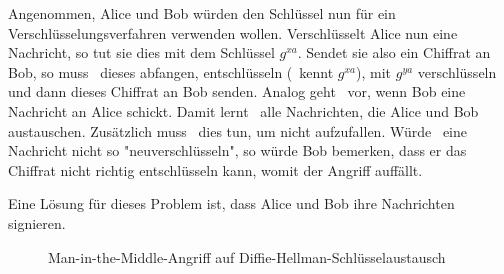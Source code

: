 Angenommen, Alice und Bob würden den Schlüssel nun für ein
Verschlüsselungsverfahren verwenden wollen. Verschlüsselt Alice nun eine
Nachricht, so tut sie dies mit dem Schlüssel $g^{xa}$. Sendet sie also ein
Chiffrat an Bob, so muss \A~dieses abfangen, entschlüsseln (\A~kennt
$g^{xa}$), mit $g^{ya}$ verschlüsseln und dann dieses Chiffrat an Bob
senden. Analog geht \A~vor, wenn Bob eine Nachricht an Alice
schickt. Damit lernt \A~alle Nachrichten, die Alice und Bob
austauschen. Zusätzlich muss \A~dies tun, um nicht aufzufallen. Würde
\A~eine Nachricht nicht so "neuverschlüsseln", so würde Bob bemerken,
dass er das Chiffrat nicht richtig entschlüsseln kann, womit der Angriff
auffällt.

Eine Lösung für dieses Problem ist, dass Alice und Bob ihre Nachrichten
signieren.
\begin{figure}[h]
  \begin{center}
  \end{center}

  \caption{Man-in-the-Middle-Angriff auf Diffie-Hellman-Schlüsselaustausch}
  \label{fig:keyex:dh-angriff}    
\end{figure}

